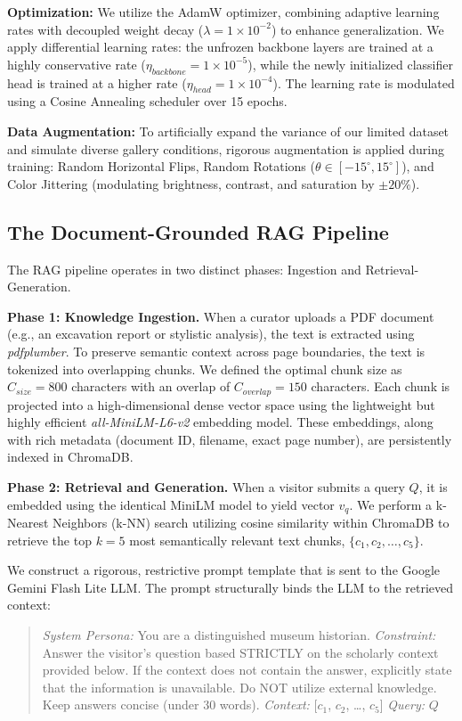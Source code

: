 \documentclass[conference]{IEEEtran}
\begin{document}
\textbf{Optimization:} We utilize the AdamW optimizer, combining adaptive learning rates with decoupled weight decay ($\lambda = 1\times10^{-2}$) to enhance generalization. We apply differential learning rates: the unfrozen backbone layers are trained at a highly conservative rate ($\eta_{backbone} = 1\times10^{-5}$), while the newly initialized classifier head is trained at a higher rate ($\eta_{head} = 1\times10^{-4}$). The learning rate is modulated using a Cosine Annealing scheduler over 15 epochs.

\textbf{Data Augmentation:} To artificially expand the variance of our limited dataset and simulate diverse gallery conditions, rigorous augmentation is applied during training: Random Horizontal Flips, Random Rotations ($\theta \in [-15^\circ, 15^\circ]$), and Color Jittering (modulating brightness, contrast, and saturation by $\pm20\%$).

\subsection{The Document-Grounded RAG Pipeline}
The RAG pipeline operates in two distinct phases: Ingestion and Retrieval-Generation.

\textbf{Phase 1: Knowledge Ingestion.} When a curator uploads a PDF document (e.g., an excavation report or stylistic analysis), the text is extracted using \textit{pdfplumber}. To preserve semantic context across page boundaries, the text is tokenized into overlapping chunks. We defined the optimal chunk size as $C_{size} = 800$ characters with an overlap of $C_{overlap} = 150$ characters. Each chunk is projected into a high-dimensional dense vector space using the lightweight but highly efficient \textit{all-MiniLM-L6-v2} embedding model. These embeddings, along with rich metadata (document ID, filename, exact page number), are persistently indexed in ChromaDB.

\textbf{Phase 2: Retrieval and Generation.} When a visitor submits a query $Q$, it is embedded using the identical MiniLM model to yield vector $v_q$. We perform a k-Nearest Neighbors (k-NN) search utilizing cosine similarity within ChromaDB to retrieve the top $k=5$ most semantically relevant text chunks, $\{c_1, c_2, \dots, c_5\}$.

We construct a rigorous, restrictive prompt template that is sent to the Google Gemini Flash Lite LLM. The prompt structurally binds the LLM to the retrieved context:

\begin{quote}
\textit{System Persona:} You are a distinguished museum historian.
\textit{Constraint:} Answer the visitor's question based STRICTLY on the scholarly context provided below. If the context does not contain the answer, explicitly state that the information is unavailable. Do NOT utilize external knowledge. Keep answers concise (under 30 words).
\textit{Context:} [$c_1$, $c_2$, \dots, $c_5$]
\textit{Query:} $Q$
\end{quote}
\end{document}

